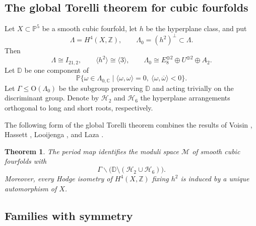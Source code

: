 \documentclass[12pt]{amsart}
\numberwithin{equation}{section}
\theoremstyle{plain}
\newtheorem{thm}{Theorem}[section]
\theoremstyle{definition}
\theoremstyle{remark}
\newcommand{\CC}{\mathbb C}
\newcommand{\ZZ}{\mathbb Z}
\newcommand{\PP}{\mathbb P}
\newcommand{\DD}{\mathbb D}
\newcommand{\calH}{\mathcal H}
\newcommand{\calM}{\mathcal M}
\begin{document}
\subsection{The global Torelli theorem for cubic fourfolds}

Let $X\subset\PP^5$ be a smooth cubic fourfold, let $h$ be the hyperplane class, and put
\[
\Lambda=H^4(X,\ZZ),\qquad \Lambda_0=(h^2)^\perp\subset\Lambda.
\]
Then
\[
\Lambda\cong I_{21,2},\qquad
\langle h^2\rangle\cong\langle3\rangle,\qquad
\Lambda_0\cong E_8^{\oplus2}\oplus U^{\oplus2}\oplus A_2.
\]
Let $\DD$ be one component of
\[
\PP\{\omega\in\Lambda_{0,\CC}\mid \langle \omega,\omega\rangle=0,
\ \langle\omega,\overline\omega\rangle<0\}.
\]
Let $\Gamma\leq\mathrm O(\Lambda_0)$ be the subgroup preserving $\DD$ and acting trivially on the discriminant group.  Denote by $\calH_2$ and $\calH_6$ the hyperplane arrangements orthogonal to long and short roots, respectively.

The following form of the global Torelli theorem combines the results of
Voisin \cite{voisin1986torelli,voisin2008erratum}, Hassett \cite{hassett2000special}, Looijenga \cite{looi2009period}, and Laza \cite{laza2010period}.

\begin{thm}\label{thm:torelli}
The period map identifies the moduli space $\calM$ of smooth cubic fourfolds with
\[
\Gamma\backslash\bigl(\DD\setminus(\calH_2\cup\calH_6)\bigr).
\]
Moreover, every Hodge isometry of $H^4(X,\ZZ)$ fixing $h^2$ is induced by a unique automorphism of $X$.
\end{thm}

\subsection{Families with symmetry}
\label{subsec:families-prescribed-symmetry}
\end{document}
